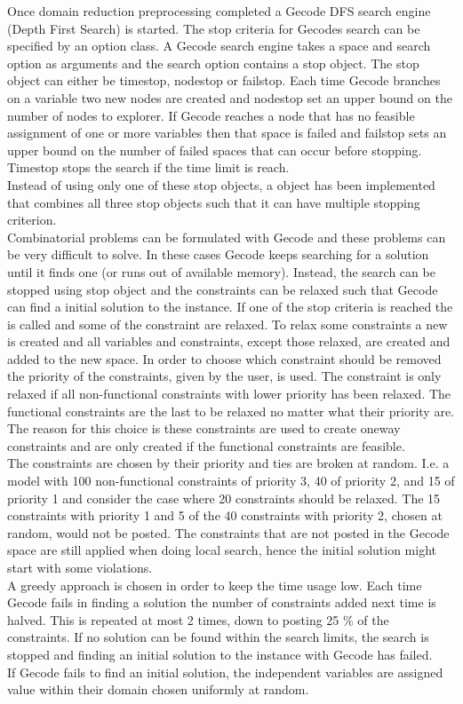 Once domain reduction preprocessing completed a Gecode DFS search engine (Depth First Search) is started. The stop 
criteria for Gecodes search can be specified by an option class. A Gecode search engine takes a space and search 
option as arguments and the search option contains a stop object. The stop object can either be timestop, nodestop or 
failstop. Each time Gecode branches on a variable two new nodes are created and nodestop set an upper bound on the 
number of nodes to explorer. If Gecode reaches a node that has no feasible assignment of one or more variables then 
that space is failed and failstop sets an upper bound on the number of failed spaces that can occur before stopping. 
Timestop stops the search if the time limit is reach. \\ 
Instead of using only one of these stop objects, a  object has been implemented that combines all 
three stop objects such that it can have multiple stopping criterion. \\ 
Combinatorial problems can be formulated with Gecode and these problems can be very difficult to solve. In these cases 
Gecode keeps searching for a solution until it finds one (or runs out of available memory). Instead, the search can be 
stopped using stop object and the constraints can be relaxed such that Gecode can find a initial solution to the 
instance. If one of the stop criteria is reached the  is called and some of the constraint are relaxed. To 
relax some constraints a new  is created and all variables and constraints, except those relaxed, 
are created and added to the new space. In order to choose which constraint should be removed the priority of the 
constraints, given by the user, is used. The constraint is only relaxed if all non-functional constraints with lower 
priority has been relaxed. The functional constraints are the last to be relaxed no matter what their priority are. The 
reason for this choice is these constraints are used to create oneway constraints and are only created if the 
functional constraints are feasible. \\
The constraints are chosen by their priority and ties are broken at random. I.e. a model with 100 
non-functional constraints of priority 3, 40 of priority 2, and 15 of priority 1 and consider the case where 20 
constraints should be relaxed. The 15 constraints with priority 1 and 5 of the 40 constraints with priority 2, chosen at 
random, would not be posted. The constraints that are not posted in the Gecode space are still applied when doing local 
search, hence the initial 
solution might start with some violations.  \\
A greedy approach is chosen in order to keep the time usage low. Each time Gecode fails in finding a solution the number 
of constraints added next time is halved. This is repeated at most 2 times, down to posting 25 \% of the constraints. If 
no solution can be found within the search 
limits, the search is stopped and finding an initial solution to the instance with Gecode has failed.  \\
If Gecode fails to find an initial solution, the independent variables are assigned value within their domain chosen 
uniformly at random. 